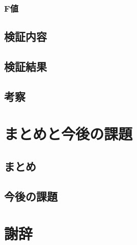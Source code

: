 \documentclass[platex]{suribt}
\begin{document}
\subsection{F値}
\section{検証内容}
\section{検証結果}
\section{考察}

\chapter{まとめと今後の課題}
\section{まとめ}
\section{今後の課題}

\backmatter%
\chapter{謝辞}%
\end{document}

